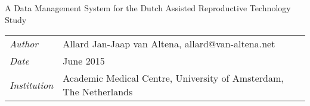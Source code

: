 \thispagestyle{empty}

\addvspace{40mm}

\begin{center}
	\bigskip
	\huge{A Data Management System for the Dutch Assisted Reproductive Technology Study}
\end{center}


\addvspace{140mm}

\begin{center}
	\begin{tabular}{l l}
		\textit{Author}			&	Allard Jan-Jaap van Altena, allard@van-altena.net\\
		\textit{Date}			&	June 2015 \\
		\textit{Institution}	&	Academic Medical Centre, University of Amsterdam, The Netherlands \\
	\end{tabular}
\end{center}

\clearpage
